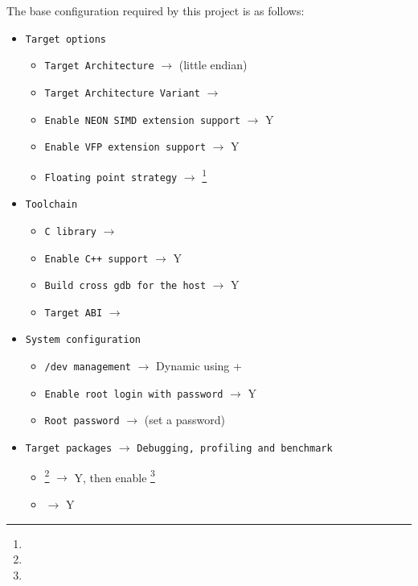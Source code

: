 The base configuration required by this project is as follows:

\begin{itemize}
    \item \texttt{Target options}
    \begin{itemize}
        \item \texttt{Target Architecture} $\rightarrow$  (little endian)
        \item \texttt{Target Architecture Variant} $\rightarrow$ 
        \item \texttt{Enable NEON SIMD extension support} $\rightarrow$ Y
        \item \texttt{Enable VFP extension support} $\rightarrow$ Y
        \item \texttt{Floating point strategy} $\rightarrow$ \footnote{}
    \end{itemize}
    \item \texttt{Toolchain}
    \begin{itemize}
        \item \texttt{C library} $\rightarrow$ 
        \item \texttt{Enable C++ support} $\rightarrow$ Y
        \item \texttt{Build cross gdb for the host} $\rightarrow$ Y
        \item \texttt{Target ABI} $\rightarrow$ 
    \end{itemize}
    \item \texttt{System configuration}
    \begin{itemize}
        \item \texttt{/dev management} $\rightarrow$ Dynamic using  + 
        \item \texttt{Enable root login with password} $\rightarrow$ Y
        \item \texttt{Root password} $\rightarrow$ (set a password)
    \end{itemize}
    \item \texttt{Target packages} $\rightarrow$ \texttt{Debugging, profiling and benchmark}
    \begin{itemize}
        \item {}\footnote{} $\rightarrow$ Y, then enable \footnote{}
        \item {} $\rightarrow$ Y
    \end{itemize}

\end{itemize}
